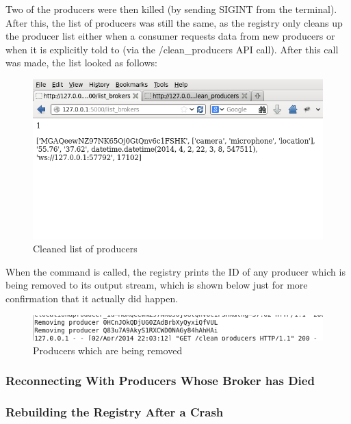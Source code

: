 Two of the producers were then killed (by sending SIGINT from the
terminal). After this, the list of producers was still the same, as the
registry only cleans up the producer list either when a consumer
requests data from new producers or when it is explicitly told to (via
the /clean\_producers API call). After this call was made, the list
looked as follows:

\begin{figure}[H]
\centering
\includegraphics{images/1-clean_producers/small_test_1-3.png}
\caption{Cleaned list of producers}
\end{figure}

When the command is called, the registry prints the ID of any producer
which is being removed to its output stream, which is shown below just
for more confirmation that it actually did happen.

\begin{figure}[H]
\centering
\includegraphics{images/1-clean_producers/small_test_1-4.png}
\caption{Producers which are being removed}
\end{figure}

\subsubsection{Reconnecting With Producers Whose Broker has
Died}\label{reconnecting-with-producers-whose-broker-has-died}

\subsubsection{Rebuilding the Registry After a
Crash}\label{rebuilding-the-registry-after-a-crash}

